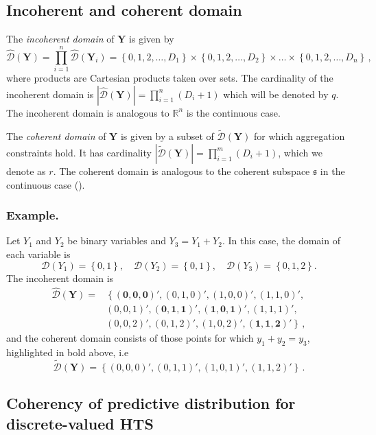 \documentclass[a4paper,review,12pt,authoryear]{elsarticle}
\newcommand{\bY}{\mathbf{Y}}
\begin{document}
\subsection{Incoherent and coherent domain}
The \textit{incoherent domain} of $\bY$ is given by
\[
\hat{\mathcal D}(\bY)=\prod\limits_{i=1}^n\hat{\mathcal D}(\bY_i)=\left\{0, 1,2,\dots,D_1\right\}\times\left\{0,1,2,\dots,D_2\right\}\times\dots\times\left\{0,1,2,\dots,D_n\right\}\,,
\] 
where products are Cartesian products taken over sets. 
The cardinality of the incoherent domain is $|\hat{\mathcal D}(\bY)|=\prod\limits_{i=1}^{n} (D_i+1)$ which will be denoted by $q$. 
The incoherent domain is analogous to $\mathbb{R}^n$ is the continuous case.
  
The \textit{coherent domain} of $\bY$ is given by a subset of $\tilde{\mathcal D}(\bY)$ for which aggregation constraints hold.  
It has cardinality $|\tilde{\mathcal D}(\bY)|=\prod\limits_{i=1}^{m} (D_i+1)$, which we denote as $r$. 
The coherent domain is analogous to the coherent subspace $\mathfrak{s}$ in the continuous case (\citealp{panagiotelisProbabilisticForecastReconciliation2022}).
  
  \subsubsection*{\textbf{Example}.}
  \label{sec:example}
  
  Let $Y_1$ and $Y_2$ be binary variables and $Y_3=Y_1+Y_2$. In this case, the domain of each variable is
  \[
    \mathcal{D}(Y_1)=\left\{0,1\right\},\quad
    \mathcal{D}(Y_2)=\left\{0,1\right\},\quad
    \mathcal{D}(Y_3)=\left\{0,1,2\right\}.
  \]   
  The incoherent domain is
  \begin{align*}
  \hat{\mathcal D}(\bY)=&\left\{\mathbf{(0,0,0)'},(0,1,0)',(1,0,0)',(1,1,0)',\right.\\
  &\left.(0,0,1)',\mathbf{(0,1,1)'},\mathbf{(1,0,1)'},(1,1,1)',\right.\\
  &\left.(0,0,2)',(0,1,2)',(1,0,2)',\mathbf{(1,1,2)'}\right\}\,,
  \end{align*}
  and the coherent domain consists of those points for which $y_1+y_2=y_3$, highlighted in bold above, i.e
  \[
      \tilde{\mathcal D}(\bY)=\left\{(0,0,0)',(0,1,1)',(1,0,1)',(1,1,2)'\right\}\,.
  \]
    
  \subsection{Coherency of predictive distribution for discrete-valued HTS}
  
\end{document}
